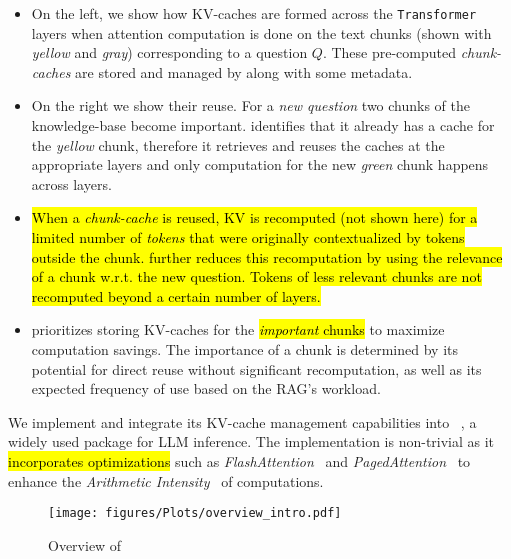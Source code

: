 \begin{itemize}
\item 
On the left, we show how KV-caches are formed across the \texttt{Transformer} layers when attention computation is done on the text chunks (shown with \textit{yellow} and \textit{gray}) corresponding to a question $Q$.
These pre-computed \textit{chunk-caches} are stored and managed by \sys along with some metadata. 

\item On the right we show their reuse. For a \textit{new question} two chunks of the knowledge-base become important. 
\sys identifies that it already has a cache for the \textit{yellow} chunk, therefore it retrieves and reuses the caches at the appropriate layers and only computation for the new \textit{green} chunk happens across layers. 

\item \hl{When a \textit{chunk-cache} is reused, KV is recomputed (not shown here) for a limited number of \textit{tokens} that were originally contextualized by tokens outside the chunk.
\sys further reduces this recomputation by using the relevance of a chunk w.r.t. the new question.
Tokens of less relevant chunks are not recomputed beyond a certain number of layers.}

\item \sys prioritizes storing KV-caches for the \hl{\textit{important} chunks} to maximize computation savings. The importance of a chunk is determined by its potential for direct reuse without significant recomputation, as well as its expected frequency of use based on the RAG's workload.

\end{itemize}

We implement \sys and integrate its KV-cache management capabilities into \vllm~\cite{kwon2023efficient}, a widely used package for LLM inference. The implementation is non-trivial
as it \hl{incorporates optimizations} such as \textit{FlashAttention}~\cite{dao2022flashattention} and \textit{PagedAttention}~\cite{kwon2023efficient} to enhance the \textit{Arithmetic Intensity}~\cite{ofenbeck2014applying} of computations.


\begin{figure}[t]
    \centering
    \texttt{[image: figures/Plots/overview\_intro.pdf]}
    
    \caption{Overview of \sys}
    \label{fig:rag_overview}
\end{figure}


